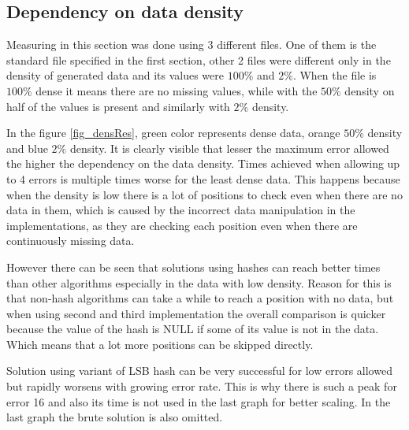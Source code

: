 \subsection{Dependency on data density}
Measuring in this section was done using 3 different files. One of them is the standard file specified in the first section, other 2 files were different only in the density of generated data and its values were $100 \%$ and $2 \%$. When the file is $100 \%$ dense it means there are no missing values, while with the $50 \%$ density on half of the values is present and similarly with $2 \%$ density.

In the figure \ref{fig_densRes}, green color represents dense data, orange $50 \%$ density and blue $2 \%$ density. It is clearly visible that lesser the maximum error allowed the higher the dependency on the data density. Times achieved when allowing up to 4 errors is multiple times worse for the least dense data. This happens because when the density is low there is a lot of positions to check even when there are no data in them, which is caused by the incorrect data manipulation in the implementations, as they are checking each position even when there are continuously missing data. 

However there can be seen that solutions using hashes can reach better times than other algorithms especially in the data with low density. Reason for this is that non-hash algorithms can take a while to reach a position with no data, but when using second and third implementation the overall comparison is quicker because the value of the hash is NULL if some of its value is not in the data. Which means that a lot more positions can be skipped directly.

Solution using variant of LSB hash can be very successful for low errors allowed but rapidly worsens with growing error rate. This is why there is such a peak for error 16 and also its time is not used in the last graph for better scaling. In the last graph the brute solution is also omitted.


